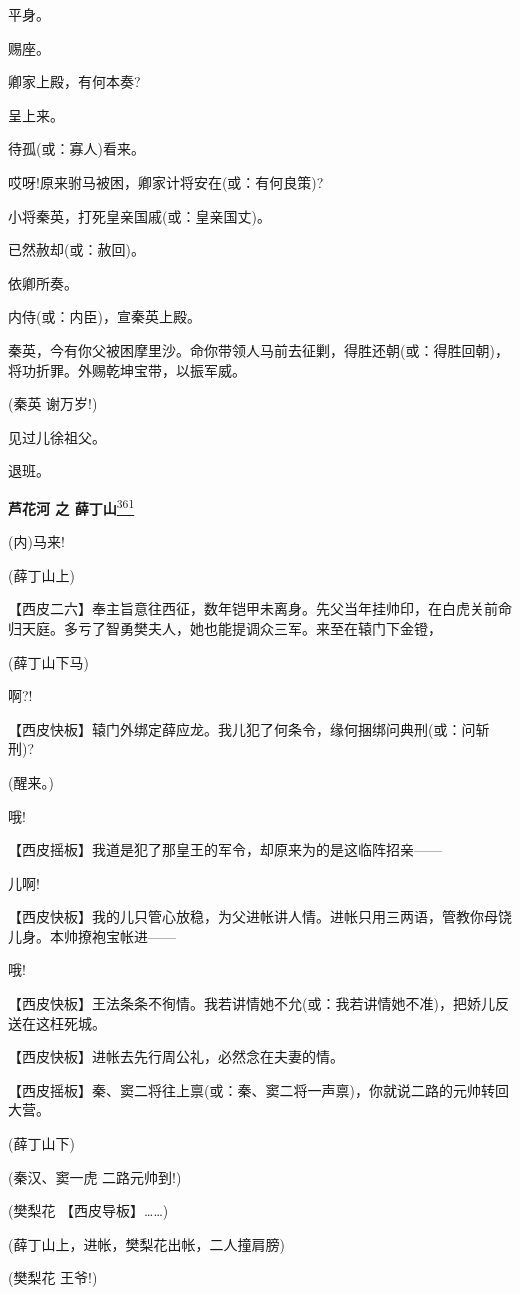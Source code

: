 平身。

赐座。

卿家上殿，有何本奏?

呈上来。

待孤(或：寡人)看来。

哎呀!原来驸马被困，卿家计将安在(或：有何良策)?

小将秦英，打死皇亲国戚(或：皇亲国丈)。

已然赦却(或：赦回)。

依卿所奏。

内侍(或：内臣)，宣秦英上殿。

秦英，今有你父被困摩里沙。命你带领人马前去征剿，得胜还朝(或：得胜回朝)，将功折罪。外赐乾坤宝带，以振军威。

(秦英 谢万岁!)

见过儿徐祖父。

退班。

\textbf{芦花河 之
薛丁山}\protect\hyperlink{fn361}{\textsuperscript{361}}

(内)马来!

(薛丁山上)

【西皮二六】奉主旨意往西征，数年铠甲未离身。先父当年挂帅印，在白虎关前命归天庭。多亏了智勇樊夫人，她也能提调众三军。来至在辕门下金镫，

(薛丁山下马)

啊?!

【西皮快板】辕门外绑定薛应龙。我儿犯了何条令，缘何捆绑问典刑(或：问斩刑)?

(醒来。)

哦!

【西皮摇板】我道是犯了那皇王的军令，却原来为的是这临阵招亲------

儿啊!

【西皮快板】我的儿只管心放稳，为父进帐讲人情。进帐只用三两语，管教你母饶儿身。本帅撩袍宝帐进------

哦!

【西皮快板】王法条条不徇情。我若讲情她不允(或：我若讲情她不准)，把娇儿反送在这枉死城。

【西皮快板】进帐去先行周公礼，必然念在夫妻的情。

【西皮摇板】秦、窦二将往上禀(或：秦、窦二将一声禀)，你就说二路的元帅转回大营。

(薛丁山下)

(秦汉、窦一虎 二路元帅到!)

(樊梨花 【西皮导板】\ldots{}\ldots{})

(薛丁山上，进帐，樊梨花出帐，二人撞肩膀)

(樊梨花 王爷!)

